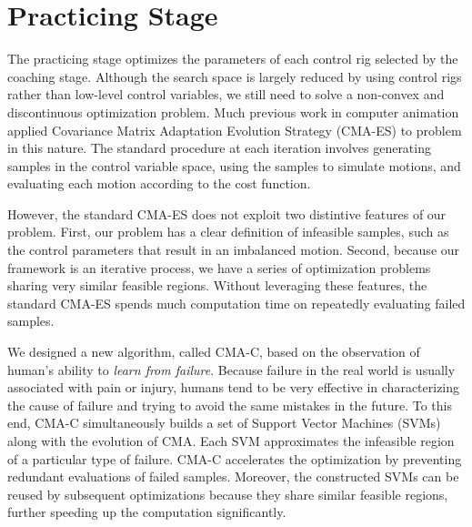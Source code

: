 \section{Practicing Stage}

The practicing stage optimizes the parameters of each control rig
selected by the coaching stage. Although the search space is
largely reduced by using control rigs rather than low-level control
variables, we still need to solve a non-convex and discontinuous
optimization problem. Much previous work in computer animation applied
Covariance Matrix Adaptation Evolution Strategy (CMA-ES) to problem in
this nature. The standard procedure at each iteration involves
generating samples in the control variable space, using the samples to
simulate motions, and evaluating each motion according to the cost
function. 

However, the standard CMA-ES does not exploit two distintive
features of our problem. First, our problem has a clear
definition of infeasible samples, such as the control parameters that
result in an imbalanced motion. Second, because our framework is an
iterative process, we have a series of optimization problems sharing
very similar feasible regions. Without leveraging these features, the
standard CMA-ES spends much computation time on repeatedly evaluating
failed samples.

We designed a new algorithm, called CMA-C, based on the observation of
human's ability to \emph{learn from failure}. Because failure in the
real world is usually associated with pain or injury, humans tend to
be very effective in characterizing the cause of failure and trying to
avoid the same mistakes in the future. To this end, CMA-C
simultaneously builds a set of Support Vector Machines (SVMs) along
with the evolution of CMA. Each SVM approximates the infeasible region
of a particular type of failure. CMA-C accelerates the optimization by
preventing redundant evaluations of failed samples. Moreover, the
constructed SVMs can be reused by subsequent optimizations because
they share similar feasible regions, further speeding up the
computation significantly.

